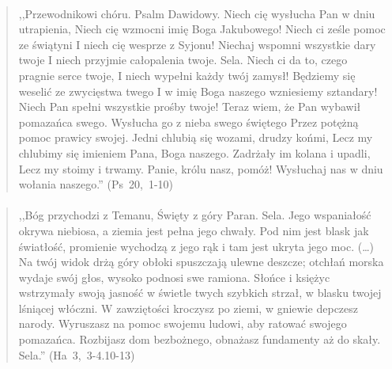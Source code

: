 \documentclass[10pt,a4paper,oneside]{article}
\begin{document}
\paragraph{}
\begin{quote}
,,Przewodnikowi chóru. Psalm Dawidowy. Niech cię wysłucha Pan w dniu utrapienia, Niech cię wzmocni imię Boga Jakubowego! Niech ci ześle pomoc ze świątyni I niech cię wesprze z Syjonu! Niechaj wspomni wszystkie dary twoje I niech przyjmie całopalenia twoje. Sela. Niech ci da to, czego pragnie serce twoje, I niech wypełni każdy twój zamysł! Będziemy się weselić ze zwycięstwa twego I w imię Boga naszego wzniesiemy sztandary! Niech Pan spełni wszystkie prośby twoje! Teraz wiem, że Pan wybawił pomazańca swego. Wysłucha go z nieba swego świętego Przez potężną pomoc prawicy swojej. Jedni chlubią się wozami, drudzy końmi, Lecz my chlubimy się imieniem Pana, Boga naszego. Zadrżały im kolana i upadli, Lecz my stoimy i trwamy. Panie, królu nasz, pomóż! Wysłuchaj nas w dniu wołania naszego.'' \mbox{(Ps 20, 1-10)}
\end{quote}
\paragraph{}
\begin{quote}
,,Bóg przychodzi z Temanu, Święty z góry Paran. Sela. Jego wspaniałość okrywa niebiosa, a ziemia jest pełna jego chwały. Pod nim jest blask jak światłość, promienie wychodzą z jego rąk i tam jest ukryta jego moc. (\ldots) Na twój widok drżą góry obłoki spuszczają ulewne deszcze; otchłań morska wydaje swój głos, wysoko podnosi swe ramiona. Słońce i księżyc wstrzymały swoją jasność w świetle twych szybkich strzał, w blasku twojej lśniącej włóczni. W zawziętości kroczysz po ziemi, w gniewie depczesz narody. Wyruszasz na pomoc swojemu ludowi, aby ratować swojego pomazańca. Rozbijasz dom bezbożnego, obnażasz fundamenty aż do skały. Sela.'' \mbox{(Ha 3, 3-4.10-13)}
\end{quote}
\end{document}
